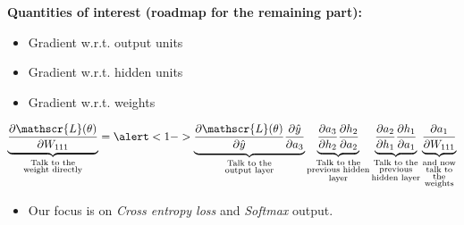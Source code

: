 \savestack{\nnoutputone}{}
\savestack{\nnoutputtwo}{}

\begin{frame}
\end{frame}

\begin{frame}
  \begin{overlayarea}{\textwidth}{\textheight}
    \textbf{Quantities of interest (roadmap for the remaining part):}
    \begin{itemize}
      \justifying
      \item \alert<1->{Gradient w.r.t. output units}
      \item Gradient w.r.t. hidden units
      \item Gradient w.r.t. weights
    \end{itemize}

    \begin{align*}
      \underbrace{\frac{\partial \mathscr{L}(\theta)}{\partial W_{111}}}_
      {\substack{\text{Talk to the}\\ \text{weight directly}}}
      =
      \alert<1->{\underbrace{\frac{\partial \mathscr{L}(\theta)}{\partial \hat{y}} \frac{\partial \hat{y}}{\partial a_{3}}}_
        {\substack{\text{Talk to the} \\ \text{output layer}}}}
      \underbrace{\frac{\partial a_{3}}{\partial h_{2}} \frac{\partial h_{2}}{\partial a_{2}}}_
      {\substack{\text{Talk to the} \\ \text{previous hidden} \\ \text{layer}}}
      \underbrace{\frac{\partial a_{2}}{\partial h_{1}} \frac{\partial h_{1}}{\partial a_{1}}}_
      {\substack{\text{Talk to the} \\ \text{previous} \\ \text{hidden layer}}}
      \underbrace{\frac{\partial a_{1}}{\partial W_{111}}}_
      {\substack{\text{and now} \\ \text{talk to} \\ \text{the} \\ \text{weights}}}
    \end{align*}
    \begin{itemize}
      \justifying
      \item Our focus is on \textit{Cross entropy loss} and \textit{Softmax} output.
    \end{itemize}

  \end{overlayarea}
\end{frame}

